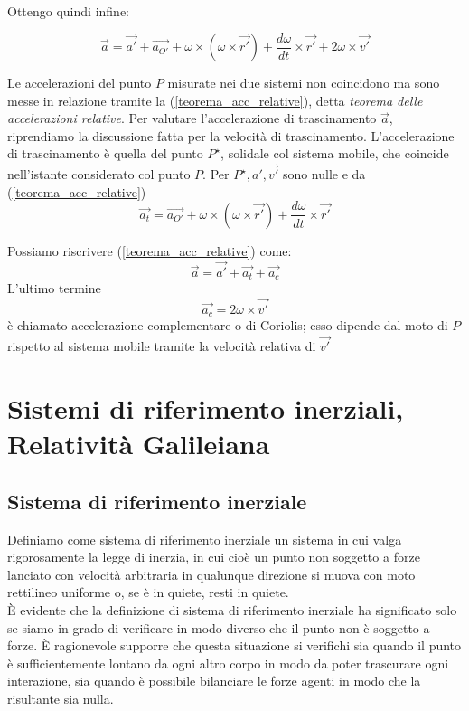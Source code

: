 \documentclass[class=book, crop=false, oneside, 12pt]{standalone}
\begin{document}
Ottengo quindi infine:

\begin{equation} \label{teorema_acc_relative}
    \overrightarrow{a} = \overrightarrow{a'} + \overrightarrow{a_{O'}} + \omega \times ( \omega \times \overrightarrow{r'}) + \frac{d \omega}{dt} \times \overrightarrow{r'} + 2 \omega \times \overrightarrow{v'}
\end{equation}

Le accelerazioni del punto \(P\) misurate nei due sistemi non coincidono ma sono messe in relazione tramite la (\ref{teorema_acc_relative}), detta \emph{teorema delle accelerazioni relative}.
Per valutare l'accelerazione di trascinamento \(\overrightarrow{a}\), riprendiamo la discussione fatta per la velocità di trascinamento. 
L'accelerazione di trascinamento è quella del punto \(P^{\star}\), solidale col sistema mobile, che coincide nell'istante considerato col punto \(P\). 
Per \(P^{\star}, \overrightarrow{a', v'}\) sono nulle e da (\ref{teorema_acc_relative})
\begin{equation}
    \overrightarrow{a_t} = \overrightarrow{a_{O'}} + \omega \times (\omega \times \overrightarrow{r'}) + \frac{d \omega }{dt} \times \overrightarrow{r'}
\end{equation}

Possiamo riscrivere (\ref{teorema_acc_relative}) come:
\begin{equation}  \label{teorema_acc_cor}
    \overrightarrow{a} = \overrightarrow{a'} + \overrightarrow{a_t} + \overrightarrow{a_c}
\end{equation}
L'ultimo termine
\begin{equation}
    \overrightarrow{a_c} = 2 \omega \times \overrightarrow{v'}
\end{equation}
è chiamato accelerazione complementare o di Coriolis; esso dipende dal moto di \(P\) rispetto al sistema mobile tramite la velocità relativa di \(\overrightarrow{v'}\)

\section{Sistemi di riferimento inerziali, Relatività Galileiana}

\subsection{Sistema di riferimento inerziale}

Definiamo come sistema di riferimento inerziale un sistema in cui valga rigorosamente la legge di inerzia, in cui cioè un punto non soggetto a forze lanciato con velocità arbitraria in qualunque direzione si muova con moto rettilineo uniforme o, se è in quiete, resti in quiete.\\
È evidente che la definizione di sistema di riferimento inerziale ha significato solo se siamo in grado di verificare in modo diverso che il punto non è soggetto a forze. 
È ragionevole supporre che questa situazione si verifichi sia quando il punto è sufficientemente lontano da ogni altro corpo in modo da poter trascurare  ogni interazione, sia quando è possibile bilanciare le forze agenti in modo che la risultante sia nulla.
\end{document}
